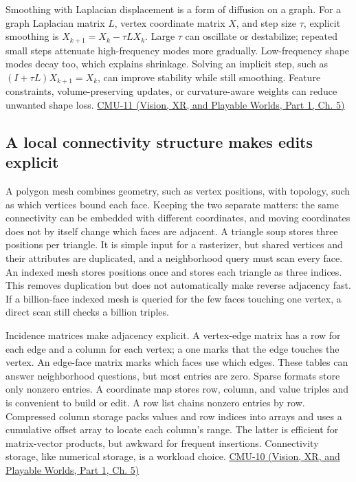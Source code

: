 Smoothing with Laplacian displacement is a form of diffusion on a graph. For a graph Laplacian matrix \(L\), vertex coordinate matrix \(X\), and step size \(\tau\), explicit smoothing is \(X_{k+1}=X_k-\tau LX_k\). Large \(\tau\) can oscillate or destabilize; repeated small steps attenuate high-frequency modes more gradually. Low-frequency shape modes decay too, which explains shrinkage. Solving an implicit step, such as \((I+\tau L)X_{k+1}=X_k\), can improve stability while still smoothing. Feature constraints, volume-preserving updates, or curvature-aware weights can reduce unwanted shape loss. \href{../07-Vision-XR-and-Playable-Worlds-P01/main.pdf\#nameddest=04-visual-computing-ii-ch036-cmu-11---digital-geometry-processing}{CMU-11 (Vision, XR, and Playable Worlds, Part 1, Ch. 5)}

\subsection{A local connectivity structure makes edits explicit}\label{03-visual-computing-i-ch002-a-local-connectivity-structure-makes-edits-explicit}

\hypertarget{03-visual-computing-i-ch002-a-local-connectivity-structure-makes-edits-explicit}{}

A polygon mesh combines geometry, such as vertex positions, with topology, such as which vertices bound each face. Keeping the two separate matters: the same connectivity can be embedded with different coordinates, and moving coordinates does not by itself change which faces are adjacent. A triangle soup stores three positions per triangle. It is simple input for a rasterizer, but shared vertices and their attributes are duplicated, and a neighborhood query must scan every face. An indexed mesh stores positions once and stores each triangle as three indices. This removes duplication but does not automatically make reverse adjacency fast. If a billion-face indexed mesh is queried for the few faces touching one vertex, a direct scan still checks a billion triples.

Incidence matrices make adjacency explicit. A vertex-edge matrix has a row for each edge and a column for each vertex; a one marks that the edge touches the vertex. An edge-face matrix marks which faces use which edges. These tables can answer neighborhood questions, but most entries are zero. Sparse formats store only nonzero entries. A coordinate map stores row, column, and value triples and is convenient to build or edit. A row list chains nonzero entries by row. Compressed column storage packs values and row indices into arrays and uses a cumulative offset array to locate each column's range. The latter is efficient for matrix-vector products, but awkward for frequent insertions. Connectivity storage, like numerical storage, is a workload choice. \href{../07-Vision-XR-and-Playable-Worlds-P01/main.pdf\#nameddest=04-visual-computing-ii-ch036-cmu-10---meshes-and-manifolds}{CMU-10 (Vision, XR, and Playable Worlds, Part 1, Ch. 5)}

